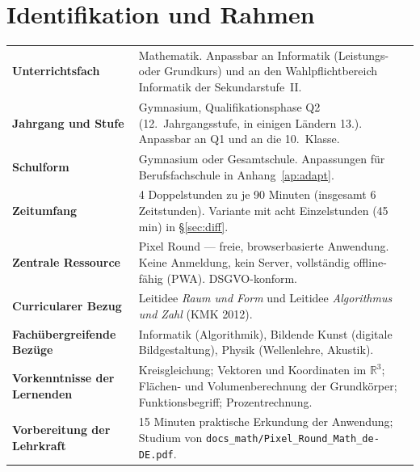 \documentclass[12pt,a4paper]{scrartcl}
\begin{document}
\renewcommand{\contentsname}{\color{accent}Inhaltsverzeichnis}
\tableofcontents
\thispagestyle{fancy}
\newpage

\section{Identifikation und Rahmen}

\begin{center}
\begin{tabular}{@{}p{}p{}@{}}
\toprule
\textbf{Unterrichtsfach} & Mathematik. Anpassbar an Informatik (Leistungs- oder Grundkurs) und an den Wahlpflichtbereich Informatik der Sekundarstufe~II. \\
\addlinespace[2pt]
\textbf{Jahrgang und Stufe} & Gymnasium, Qualifikationsphase Q2 (12.~Jahrgangsstufe, in einigen Ländern 13.). Anpassbar an Q1 und an die 10.~Klasse. \\
\addlinespace[2pt]
\textbf{Schulform} & Gymnasium oder Gesamtschule. Anpassungen für Berufsfachschule in Anhang~\ref{ap:adapt}. \\
\addlinespace[2pt]
\textbf{Zeitumfang} & 4 Doppelstunden zu je 90 Minuten (insgesamt 6 Zeitstunden). Variante mit acht Einzelstunden (45 min) in §\ref{sec:diff}. \\
\addlinespace[2pt]
\textbf{Zentrale Ressource} & Pixel Round --- freie, browserbasierte Anwendung. Keine Anmeldung, kein Server, vollständig offline-fähig (PWA). DSGVO-konform. \\
\addlinespace[2pt]
\textbf{Curricularer Bezug} & Leitidee \emph{Raum und Form} und Leitidee \emph{Algorithmus und Zahl} (KMK 2012). \\
\addlinespace[2pt]
\textbf{Fachübergreifende Bezüge} & Informatik (Algorithmik), Bildende Kunst (digitale Bildgestaltung), Physik (Wellenlehre, Akustik). \\
\addlinespace[2pt]
\textbf{Vorkenntnisse der Lernenden} & Kreisgleichung; Vektoren und Koordinaten im $\mathbb{R}^3$; Flächen- und Volumenberechnung der Grundkörper; Funktionsbegriff; Prozentrechnung. \\
\addlinespace[2pt]
\textbf{Vorbereitung der Lehrkraft} & 15 Minuten praktische Erkundung der Anwendung; Studium von \texttt{docs\_math/Pixel\_Round\_Math\_de-DE.pdf}. \\
\bottomrule
\end{tabular}
\end{center}
\end{document}
